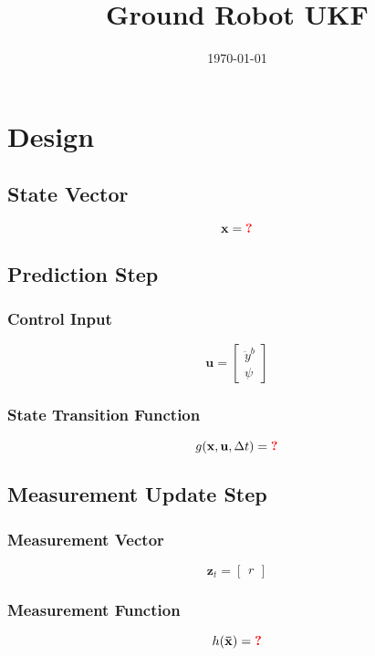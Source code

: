 \documentclass{article}
\title{Ground Robot UKF}
\author{\todo{Student name here}}
\date{\today}
\newcommand{\todo}[1]{\textcolor{red}{\textbf{#1}}}
\begin{document}
\maketitle

\section{Design}

\subsection{State Vector}

\begin{equation}
  \mathbf{x}=\todo{?}
\end{equation}

\subsection{Prediction Step}

\subsubsection{Control Input}

\begin{equation}
  \mathbf{u} = \begin{bmatrix}
  \ddot y^b \\
  \psi
  \end{bmatrix}
\end{equation}

\subsubsection{State Transition Function}

\begin{equation}
  g(\mathbf{x}, \mathbf{u}, \Delta t) = \todo{?}
\end{equation}

\subsection{Measurement Update Step}

\subsubsection{Measurement Vector}

\begin{equation}
  \mathbf{z}_t = \begin{bmatrix}
  r
  \end{bmatrix}
\end{equation}

\subsubsection{Measurement Function}

\begin{equation}
  h(\mathbf{\bar x}) = \todo{?}
\end{equation}
\end{document}
